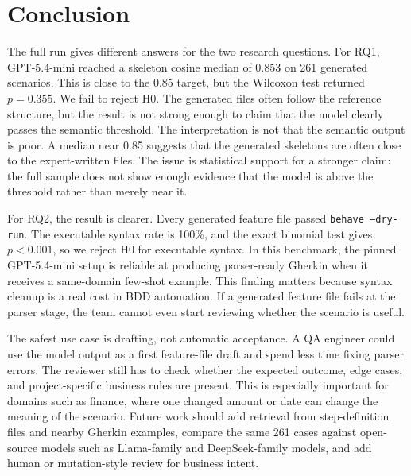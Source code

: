 \section{Conclusion}
\label{sec:conclusion}

The full run gives different answers for the two research questions. For RQ1, GPT-5.4-mini reached a skeleton cosine median of 0.853 on 261 generated scenarios. This is close to the 0.85 target, but the Wilcoxon test returned $p=0.355$. We fail to reject H0. The generated files often follow the reference structure, but the result is not strong enough to claim that the model clearly passes the semantic threshold. The interpretation is not that the semantic output is poor. A median near 0.85 suggests that the generated skeletons are often close to the expert-written files. The issue is statistical support for a stronger claim: the full sample does not show enough evidence that the model is above the threshold rather than merely near it.

For RQ2, the result is clearer. Every generated feature file passed \texttt{behave --dry-run}. The executable syntax rate is 100\%, and the exact binomial test gives $p < 0.001$, so we reject H0 for executable syntax. In this benchmark, the pinned GPT-5.4-mini setup is reliable at producing parser-ready Gherkin when it receives a same-domain few-shot example. This finding matters because syntax cleanup is a real cost in BDD automation. If a generated feature file fails at the parser stage, the team cannot even start reviewing whether the scenario is useful.

The safest use case is drafting, not automatic acceptance. A QA engineer could use the model output as a first feature-file draft and spend less time fixing parser errors. The reviewer still has to check whether the expected outcome, edge cases, and project-specific business rules are present. This is especially important for domains such as finance, where one changed amount or date can change the meaning of the scenario. Future work should add retrieval from step-definition files and nearby Gherkin examples, compare the same 261 cases against open-source models such as Llama-family and DeepSeek-family models, and add human or mutation-style review for business intent.

